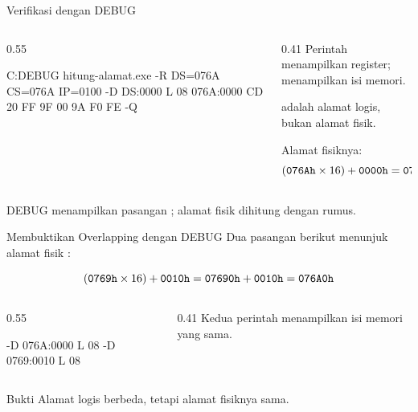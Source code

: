 \documentclass[aspectratio=169,11pt]{beamer}
\begin{document}
\begin{frame}[fragile]{Verifikasi dengan DEBUG}
\begin{columns}[t]
\begin{column}{0.55\textwidth}
\begin{keluaran}
C:\>DEBUG hitung-alamat.exe
-R
DS=076A  CS=076A  IP=0100
-D DS:0000 L 08
076A:0000  CD 20 FF 9F 00 9A F0 FE
-Q
\end{keluaran}
\end{column}
\begin{column}{0.41\textwidth}
\footnotesize
Perintah  menampilkan register;  menampilkan isi
memori.

\vspace{0.3em}
 adalah alamat logis, bukan alamat fisik.

\vspace{0.3em}
Alamat fisiknya:
\[
(\texttt{076Ah} \times 16) + \texttt{0000h} = \texttt{076A0h}
\]
\end{column}
\end{columns}

\vspace{0.2em}
{\footnotesize\color{obeGray}DEBUG menampilkan pasangan
; alamat fisik dihitung dengan rumus.\par}
\end{frame}

\begin{frame}[fragile]{Membuktikan Overlapping dengan DEBUG}
\small
Dua pasangan berikut menunjuk alamat fisik :

\[
(\texttt{0769h} \times 16) + \texttt{0010h}
= \texttt{07690h} + \texttt{0010h} = \texttt{076A0h}
\]

\begin{columns}[t]
\begin{column}{0.55\textwidth}
\begin{keluaran}
-D 076A:0000 L 08
-D 0769:0010 L 08
\end{keluaran}
\end{column}
\begin{column}{0.41\textwidth}
\footnotesize
Kedua perintah menampilkan isi memori yang sama.
\end{column}
\end{columns}

\vspace{0.3em}
\begin{block}{Bukti}
\small Alamat logis berbeda, tetapi alamat fisiknya sama.
\end{block}
\end{frame}
\end{document}
